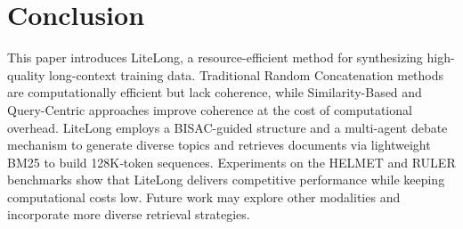 \documentclass{article}
\theoremstyle{plain}
\theoremstyle{definition}
\theoremstyle{remark}
\begin{document}
\section{Conclusion}
    This paper introduces LiteLong, a resource-efficient method for synthesizing high-quality long-context training data. Traditional Random Concatenation methods are computationally efficient but lack coherence, while Similarity-Based and Query-Centric approaches improve coherence at the cost of computational overhead. LiteLong employs a BISAC-guided structure and a multi-agent debate mechanism to generate diverse topics and retrieves documents via lightweight BM25 to build 128K‑token sequences. Experiments on the HELMET and RULER benchmarks show that LiteLong delivers competitive performance while keeping computational costs low. Future work may explore other modalities and incorporate more diverse retrieval strategies.






\end{document}
